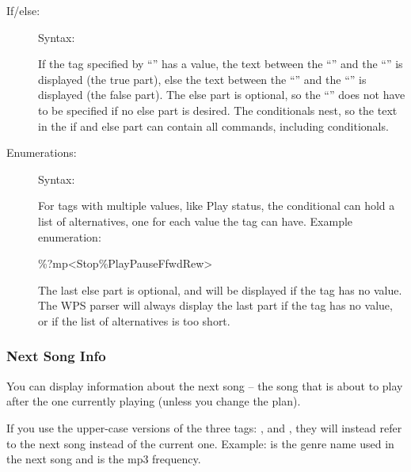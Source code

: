 \begin{description}
\item[If/else: ]
Syntax: 

If the tag specified by ``'' has a value, the text between the 
``\config{{\textless}}'' and the ``\config{{\textbar}}'' is displayed (the true
part), else the text between the ``\config{{\textbar}}'' and the 
``\config{{\textgreater}}'' is displayed (the false part).
The else part is optional, so the ``\config{{\textbar}}'' does not have to be 
specified if no else part is desired. The conditionals nest, so the text in the
if and else part can contain all \config{\%} commands, including conditionals.

\item[Enumerations: ]
Syntax: 

For tags with multiple values, like Play status, the conditional can hold a 
list of alternatives, one for each value the tag can have.
Example enumeration: 
\begin{example}
     \%?mp{\textless}Stop{\textbar}\%Play{\textbar}Pause{\textbar}Ffwd{\textbar}Rew{\textgreater}
\end{example}

The last else part is optional, and will be displayed if the tag has no value. 
The WPS parser will always display the last part if the tag has no value, or if
the list of alternatives is too short.
\end{description}

\subsubsection{Next Song Info}
You can display information about the next song -- the song that is
about to play after the one currently playing (unless you change the
plan).

If you use the upper-case versions of the
three tags: ,  and , they will instead refer to 
the next song instead of the current one. Example:  is the genre 
name used in the next song and  is the mp3 frequency.\\


